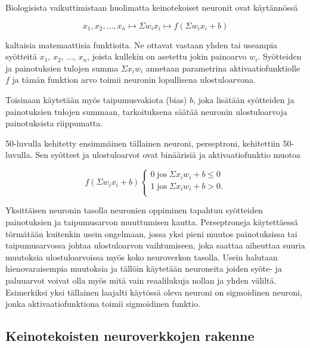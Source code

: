 \documentclass[finnish]{tktltiki2}
\theoremstyle{definition}
\theoremstyle{remark}
\begin{document}
    Biologisista vaikuttimistaan huolimatta keinotekoiset neuronit ovat käytännössä 

     $$ x_1, x_2, ..., x_n \mapsto \Sigma w_i x_i \mapsto f(\Sigma w_i x_i + b) $$

    kaltaisia matemaattisia funktioita. Ne ottavat vastaan yhden tai useampia syötteitä $x_1$, $x_2$, ..., $x_n$, joista kullekin on asetettu jokin painoarvo $w_i$. Syötteiden ja painotuksien tulojen summa $\Sigma x_i w_i$ annetaan parametrina aktivaatiofunktiolle $f$ ja tämän funktion arvo toimii neuronin lopullisena ulostuloarvona.

    Toisinaan käytetään myös taipumusvakiota (bias) $b$, joka lisätään syötteiden ja painotuksien tulojen summaan, tarkoituksena säätää neuronin ulostuloarvoja painotuksista riippumatta.

    50-luvulla kehitetty ensimmäinen tällainen neuroni, perseptroni, kehitettiin 50-luvulla. Sen syötteet ja ulostuloarvot ovat binäärisiä ja aktivaatiofunktio muotoa

    \begin{equation}
      \label{eq:perceptron}
      f(\Sigma w_i x_i + b)
      \begin{cases}
        0\; \text{jos} \; \Sigma x_i w_i + b \leq 0 \\
        1\; \text{jos} \; \Sigma x_i w_i + b > 0. \\
      \end{cases}
    \end{equation}

    Yksittäisen neuronin tasolla neuronien oppiminen tapahtuu syötteiden painotuksien ja taipumusarvon muuttumisen kautta. Perseptroneja käytettäessä törmätään kuitenkin usein ongelmaan, jossa yksi pieni muutos painotuksissa tai taipumusarvossa johtaa ulostuloarvon vaihtumiseen, joka saattaa aiheuttaa suuria muutoksia ulostuloarvoissa myös koko neuroverkon tasolla. Usein halutaan hienovaraisempia muutoksia ja tällöin käytetään neuroneita joiden syöte- ja paluuarvot voivat olla myös mitä vain reaalilukuja nollan ja yhden väliltä. Esimerkiksi yksi tällainen laajalti käytössä oleva neuroni on sigmoidinen neuroni, jonka aktivaatiofunktiona toimii sigmoidinen funktio.



  \subsection{Keinotekoisten neuroverkkojen rakenne}
\end{document}
